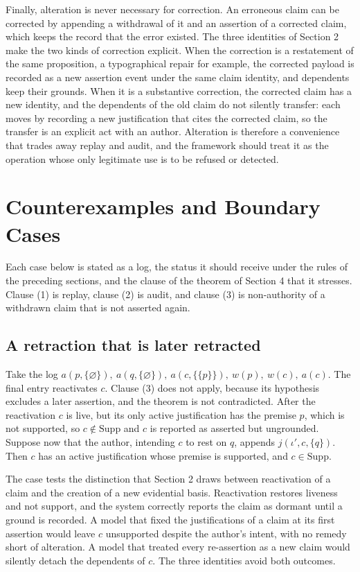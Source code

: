 \documentclass[11pt]{article}
\theoremstyle{plain}
\theoremstyle{definition}
\theoremstyle{remark}
\begin{document}
Finally, alteration is never necessary for correction. An erroneous claim can be corrected by appending a withdrawal of it and an assertion of a corrected claim, which keeps the record that the error existed. The three identities of Section 2 make the two kinds of correction explicit. When the correction is a restatement of the same proposition, a typographical repair for example, the corrected payload is recorded as a new assertion event under the same claim identity, and dependents keep their grounds. When it is a substantive correction, the corrected claim has a new identity, and the dependents of the old claim do not silently transfer: each moves by recording a new justification that cites the corrected claim, so the transfer is an explicit act with an author. Alteration is therefore a convenience that trades away replay and audit, and the framework should treat it as the operation whose only legitimate use is to be refused or detected.

\section{Counterexamples and Boundary Cases}
Each case below is stated as a log, the status it should receive under the rules of the preceding sections, and the clause of the theorem of Section 4 that it stresses. Clause (1) is replay, clause (2) is audit, and clause (3) is non-authority of a withdrawn claim that is not asserted again.

\subsection{A retraction that is later retracted}
Take the log $a(p,\{\varnothing\}),\ a(q,\{\varnothing\}),\ a(c,\{\{p\}\}),\ w(p),\ w(c),\ a(c)$. The final entry reactivates $c$. Clause (3) does not apply, because its hypothesis excludes a later assertion, and the theorem is not contradicted. After the reactivation $c$ is live, but its only active justification has the premise $p$, which is not supported, so $c\notin\mathrm{Supp}$ and $c$ is reported as asserted but ungrounded. Suppose now that the author, intending $c$ to rest on $q$, appends $j(\iota',c,\{q\})$. Then $c$ has an active justification whose premise is supported, and $c\in\mathrm{Supp}$.

The case tests the distinction that Section 2 draws between reactivation of a claim and the creation of a new evidential basis. Reactivation restores liveness and not support, and the system correctly reports the claim as dormant until a ground is recorded. A model that fixed the justifications of a claim at its first assertion would leave $c$ unsupported despite the author's intent, with no remedy short of alteration. A model that treated every re-assertion as a new claim would silently detach the dependents of $c$. The three identities avoid both outcomes.
\end{document}
